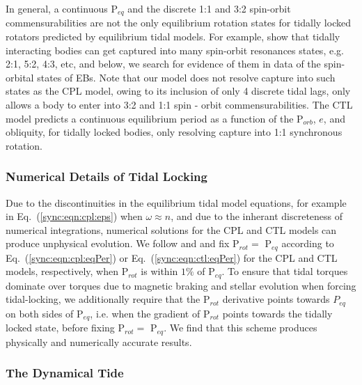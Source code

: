 In general, a continuous P$_{eq}$ and the discrete 1:1 and 3:2 spin-orbit commensurabilities are not the only equilibrium rotation states for tidally locked rotators predicted by equilibrium tidal models. For example, \citet{Rodriguez2012} show that tidally interacting bodies can get captured into many spin-orbit resonances states, e.g. 2:1, 5:2, 4:3, etc, and below, we search for evidence of them in data of the spin-orbital states of \kepler EBs. Note that our model does not resolve capture into such states as the CPL model, owing to its inclusion of only 4 discrete tidal lags, only allows a body to enter into 3:2 and 1:1 spin - orbit commensurabilities. The CTL model predicts a continuous equilibrium period as a function of the P$_{orb}$, $e$, and obliquity, for tidally locked bodies, only resolving capture into 1:1 synchronous rotation.

\subsubsection{Numerical Details of Tidal Locking}

Due to the discontinuities in the equilibrium tidal model equations, for example in Eq.~(\ref{sync:eqn:cpl:eps}) when $\omega \approx n$, and due to the inherant discreteness of numerical integrations, numerical solutions for the CPL and CTL models can produce unphysical evolution. We follow \citet{Barnes2013} and \citet{Fleming2018} and fix P$_{rot} = $ P$_{eq}$ according to Eq.~(\ref{sync:eqn:cpl:eqPer}) or Eq.~(\ref{sync:eqn:ctl:eqPer}) for the CPL and CTL models, respectively, when P$_{rot}$ is within $1\%$ of P$_{eq}$.  To ensure that tidal torques dominate over torques due to magnetic braking and stellar evolution when forcing tidal-locking, we additionally require that the P$_{rot}$ derivative points towards $P_{eq}$ on both sides of P$_{eq}$, i.e. when the gradient of P$_{rot}$ points towards the tidally locked state, before fixing P$_{rot} = $ P$_{eq}$. We find that this scheme produces physically and numerically accurate results. 

\subsubsection{The Dynamical Tide} \label{sync:sec:methods:dynamicalTide}

